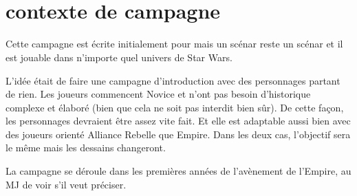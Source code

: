 \documentclass{jdrp}
\begin{document}
	\begin{titlepage}

	\begin{center}
		\hspace*{\vfill}
		\noindent\Huge{}\\ 
		\noindent\fontsize{50}{70}\jedifont{\$}
		\noindent\fontsize{50}{70}\jedifont{\#}\\
		\noindent\fontsize{50}{60}
		\hspace*{\vfill}
	\end{center}

	\hspace*{\vfill}

	\noindent{}

	\end{titlepage}

	\onecolumn
	\section{contexte de campagne}
	
	Cette campagne est écrite initialement pour  mais un scénar reste un scénar et il est jouable dans n’importe quel univers de Star Wars.

	L’idée était de faire une campagne d’introduction avec des personnages partant de rien. Les joueurs commencent Novice et n’ont pas besoin d’historique complexe et élaboré (bien que cela ne soit pas interdit bien sûr). De cette façon, les personnages devraient être assez vite fait. Et elle est adaptable aussi bien avec des joueurs orienté Alliance Rebelle que Empire. Dans les deux cas, l’objectif sera le même mais les dessains changeront.

	La campagne se déroule dans les premières années de l’avènement de l’Empire, au MJ de voir s’il veut préciser.
\end{document}
